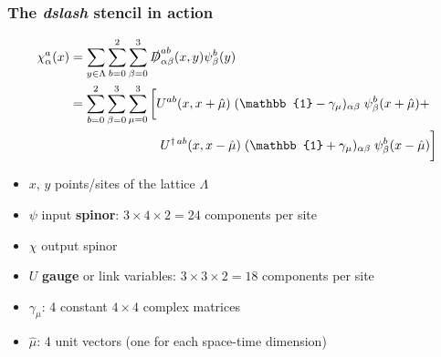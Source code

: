 \documentclass{beamer}
\begin{document}
  \begin{frame}
    \frametitle{The \textit{dslash} stencil in action}

    \begin{align*}
      \nonumber
      \chi^a_\alpha(x) &= \sum_{y \in \Lambda} \sum_{b = 0}^2 \sum_{\beta = 0}^3 \slashed D^{ab}_{\alpha \beta}(x,y) \psi^b_\beta(y) \\
      &= \sum_{b = 0}^2 \sum_{\beta = 0}^3 \sum_{\mu=0}^3
      \bigg[
        U^{ab}(x,x+\hat\mu) \; (\mathbb{1}-\gamma_\mu)_{\alpha\beta} \; \psi^b_\beta(x+\hat\mu) + \\
        \nonumber
        &\hspace{25.0mm}
        U^{\dagger\, ab}(x,x-\hat\mu) \; (\mathbb{1}+\gamma_\mu)_{\alpha\beta} \; \psi^b_\beta(x-\hat\mu)
      \bigg]
    \end{align*}

    \begin{itemize}
      \item $x,\,y$ points/sites of the lattice $\Lambda$\\
      \item $\psi$ input \textbf{spinor}: $3 \times 4 \times 2 = 24$ components per site\\
      \item $\chi$ output spinor\\
      \item $U$ \textbf{gauge} or link variables: $3 \times 3 \times 2 = 18$ components per site\\
      \item $\gamma_\mu$: 4 constant $4 \times 4$ complex matrices
      \item $\hat \mu$: 4 unit vectors (one for each space-time dimension)
    \end{itemize}

  \end{frame}

\end{document}
